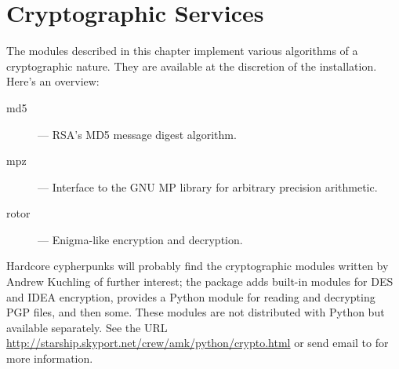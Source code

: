\chapter{Cryptographic Services}
\label{crypto}

The modules described in this chapter implement various algorithms of
a cryptographic nature.  They are available at the discretion of the
installation.  Here's an overview:

\begin{description}

\item[md5]
--- RSA's MD5 message digest algorithm.

\item[mpz]
--- Interface to the GNU MP library for arbitrary precision arithmetic.

\item[rotor]
--- Enigma-like encryption and decryption.

\end{description}

Hardcore cypherpunks will probably find the cryptographic modules
written by Andrew Kuchling of further interest; the package adds
built-in modules for DES and IDEA encryption, provides a Python module
for reading and decrypting PGP files, and then some.  These modules
are not distributed with Python but available separately.  See the URL
\url{http://starship.skyport.net/crew/amk/python/crypto.html} or
send email to  for more information.
